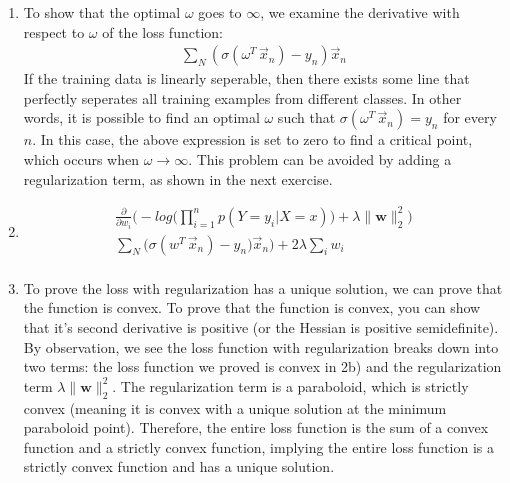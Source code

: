 \documentclass[12pt]{article}
\begin{document}
\begin{enumerate}[label=\alph*.]
    \item
	To show that the optimal $\omega$ goes to $\infty$, we examine the derivative with respect to $\omega$ of the loss function:
	\begin{gather*}
		\sum_N{ (\sigma(\omega^T \, \vec{x}_n) - y_n)\vec{x}_n}
	\end{gather*}
	If the training data is linearly seperable, then there exists some line that perfectly seperates all training examples  from different classes. In other words, it is possible to find an optimal $\omega$ such that $\sigma(\omega^T \, \vec{x}_n) = y_n$ for every $n$. In this case, the above expression is set to zero to find a critical point, which occurs when $\omega \rightarrow \infty$. This problem can be avoided by adding a regularization term, as shown in the next exercise.

    \item 
	\begin{gather*}
		\frac{\partial}{\partial w_i} \bigg( -log \bigg( \prod_{i=1}^{n}{p(Y = y_i | X = x)} \bigg) + \lambda \lVert \mathbf{w} \rVert_2^2 \bigg) \\
		\sum_N{\bigg( \sigma(w^T \, \vec{x}_n) - y_n)\vec{x}_n \bigg)} + 2 \lambda \sum_i{w_i} \\
	\end{gather*}

    \item
	To prove the loss with regularization has a unique solution, we can prove that the function is convex. To prove that the function is convex, you can show that it's second derivative is positive (or the Hessian is positive semidefinite). By observation, we see the loss function with regularization breaks down into two terms: the loss function we proved is convex in 2b) and the regularization term $ \lambda \lVert \mathbf{w} \rVert_2^2 $. The regularization term is a paraboloid, which is strictly convex (meaning it is convex with a unique solution at the minimum paraboloid point). Therefore, the entire loss function is the sum of a convex function and a strictly convex function, implying the entire loss function is a strictly convex function and has a unique solution.
	
\end{enumerate}
\end{document}
